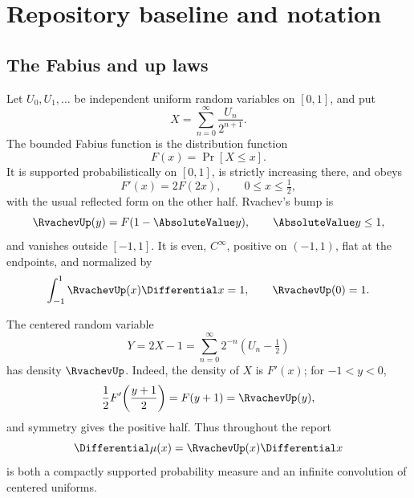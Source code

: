 \documentclass[11pt,oneside]{article}
\theoremstyle{definition}
\theoremstyle{remark}
\numberwithin{equation}{section}
\begin{document}
\section{Repository baseline and notation}
\label{sec:baseline}

\subsection{The Fabius and up laws}
Let $U_0,U_1,\ldots$ be independent uniform random variables on $[0,1]$, and
put
\begin{equation}
 X=\sum_{n=0}^{\infty}\frac{U_n}{2^{n+1}}.
 \label{eq:X-random}
\end{equation}
The bounded Fabius function is the distribution function
\begin{equation}
 F(x)=\Pr[X\le x].
 \label{eq:F-cdf}
\end{equation}
It is supported probabilistically on $[0,1]$, is strictly increasing there,
and obeys
\begin{equation}
 F'(x)=2F(2x),\qquad 0\le x\le\tfrac12,
 \label{eq:F-differential}
\end{equation}
with the usual reflected form on the other half.  Rvachev's bump is
\begin{equation}
 \RvachevUp(y)=F(1-\AbsoluteValue y),\qquad \AbsoluteValue y\le1,
 \label{eq:up-fold}
\end{equation}
and vanishes outside $[-1,1]$.  It is even, $C^\infty$, positive on
$(-1,1)$, flat at the endpoints, and normalized by
\begin{equation}
 \int_{-1}^{1}\RvachevUp(x)\Differential x=1,
 \qquad \RvachevUp(0)=1.
 \label{eq:up-normalization}
\end{equation}

The centered random variable
\begin{equation}
 Y=2X-1=\sum_{n=0}^{\infty}2^{-n}\left(U_n-\tfrac12\right)
 \label{eq:Y-random}
\end{equation}
has density $\RvachevUp$.  Indeed, the density of $X$ is $F'(x)$; for $-1<y<0$,
\[
 \frac12F'\!\left(\frac{y+1}{2}\right)=F(y+1)=\RvachevUp(y),
\]
and symmetry gives the positive half.  Thus throughout the report
\begin{equation}
 \Differential\mu(x)=\RvachevUp(x)\Differential x
 \label{eq:mu-def}
\end{equation}
is both a compactly supported probability measure and an infinite convolution
of centered uniforms.
\end{document}
